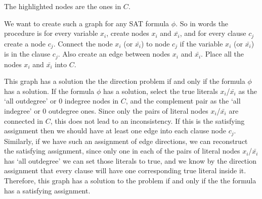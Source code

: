 \documentclass[english]{article}
\begin{document}
The highlighted nodes are the ones in $C$. 

We want to create such a graph for any SAT formula $\phi$. So in words the procedure is for every variable $x_i$,
create nodes $x_i$ and $\bar{x_i}$, and for every clause $c_j$ create a node $c_j$. Connect the node $x_i$
(or $\bar{x_i}$) to node $c_j$ if the variable $x_i$ (or $\bar{x_i}$) is in the clause $c_j$. Also create an edge
between nodes $x_i$ and $\bar{x_i}$. Place all the nodes $x_i$ and $\bar{x_i}$ into $C$. 

This graph has a solution the the direction problem if and only if the formula $\phi$ has a solution. If the
formula $\phi$ has a solution, select the true literals $x_i$/$\bar{x_i}$ as the `all outdegree' or 0 indegree nodes
in $C$, and the complement pair as the `all indegree' or 0 outdegree ones. Since only the pairs of literal nodes
$x_i$/$\bar{x_i}$ are connected in $C$, this does not lead to an inconsistency. If this is the satisfying assignment
then we should have at least one edge into each clause node $c_j$. Similarly, if we have such an assignment of edge
directions, we can reconstruct the satisfying assignment, since only one in each of the pairs of literal nodes
$x_i$/$\bar{x_i}$ has `all outdegree' we can set those literals to true, and we know by the direction assignment
that every clause will have one corresponding true literal inside it. Therefore, this graph has a solution to the
problem if and only if the the formula has a satisfying assignment. 
\end{document}
